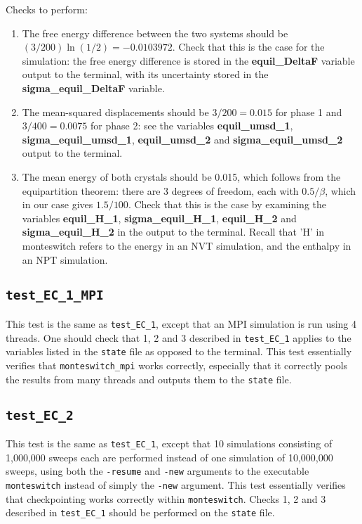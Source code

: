 \documentclass{report}
\begin{document}
Checks to perform:
\begin{enumerate}
\item
The free energy difference between the two systems should be $(3/200)\ln(1/2)=-0.0103972$. 
Check that this is the case for the simulation: the free energy difference is stored in the \textbf{equil\_DeltaF}
variable output to the terminal, with its uncertainty stored in the \textbf{sigma\_equil\_DeltaF} variable. 
\item
The mean-squared displacements should be $3/200=0.015$ for phase 1 and $3/400=0.0075$ for phase 2: see the 
variables \textbf{equil\_umsd\_1}, \textbf{sigma\_equil\_umsd\_1}, \textbf{equil\_umsd\_2} and \textbf{sigma\_equil\_umsd\_2} 
output to the terminal.
\item
The mean energy of both crystals should be 0.015, which follows from the equipartition theorem:
there are 3 degrees of freedom, each with $0.5/\beta$, which in our case gives $1.5/100$. Check that this
is the case by examining the variables \textbf{equil\_H\_1}, \textbf{sigma\_equil\_H\_1}, \textbf{equil\_H\_2} and 
\textbf{sigma\_equil\_H\_2} in the output to the terminal. Recall that 'H' in monteswitch refers to the energy in 
an NVT simulation, and the enthalpy in an NPT simulation.   
\end{enumerate}


\subsection{\texttt{test\_EC\_1\_MPI}}
This test is the same as \texttt{test\_EC\_1}, except that an MPI simulation is run using 4 threads. One should check that
1, 2 and 3 described in \texttt{test\_EC\_1} applies to the variables listed in the \texttt{state} file as opposed to the
terminal. This test essentially verifies that \texttt{monteswitch\_mpi} works correctly, especially that it correctly pools 
the results from many threads and outputs them to the \texttt{state} file.


\subsection{\texttt{test\_EC\_2}}
This test is the same as \texttt{test\_EC\_1}, except that 10 simulations consisting of 1,000,000 sweeps each are performed
instead of one simulation of 10,000,000 sweeps, using both the \texttt{-resume} and \texttt{-new} arguments to the executable 
\texttt{monteswitch} instead of simply the \texttt{-new} argument. This test essentially verifies that checkpointing works
correctly within \texttt{monteswitch}. Checks 1, 2 and 3 described in \texttt{test\_EC\_1} should be performed on the 
\texttt{state} file.
\end{document}
